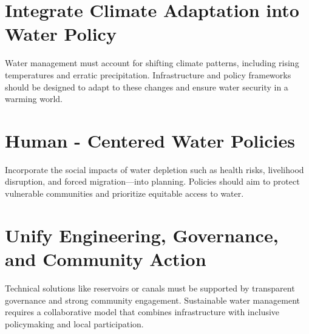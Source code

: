 \section{Integrate Climate Adaptation into Water Policy }
    Water management must account for shifting climate patterns, including rising temperatures and erratic precipitation. Infrastructure and policy frameworks should be designed to adapt to these changes and ensure water security in a warming world. 

\section{Human - Centered Water Policies }
    Incorporate the social impacts of water depletion such as health risks, livelihood disruption, and forced migration—into planning. Policies should aim to protect vulnerable communities and prioritize equitable access to water. 

\section{Unify Engineering, Governance, and Community Action }
    Technical solutions like reservoirs or canals must be supported by transparent governance and strong community engagement. Sustainable water management requires a collaborative model that combines infrastructure with inclusive policymaking and local participation. 